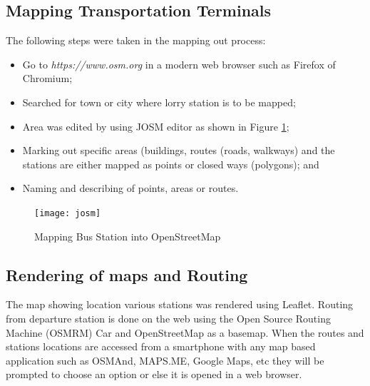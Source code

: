 \subsection{Mapping Transportation Terminals}
The following steps were taken in the mapping out process:
\begin{itemize}
	\item Go to \textit{https://www.osm.org} in a modern web browser such as Firefox of Chromium; 
	\item Searched for town or city where lorry station is to be mapped; 
	\item Area was edited by using JOSM editor as shown in Figure \ref{fig:josm};
	\item Marking out specific areas (buildings, routes (roads, walkways) and the stations are either mapped as points or closed ways (polygons); and
	\item Naming  and describing of points, areas or routes. 
\end{itemize}

\begin{figure}[H]
	\centering
	\texttt{[image: josm]}
	\caption[Mapping Bus Station into OpenStreetMap]{Mapping Bus Station into OpenStreetMap}
	\label{fig:josm}
\end{figure}

\subsection{Rendering of maps and Routing}
The map showing location various stations was rendered using Leaflet. Routing from departure station is done on the web using the Open Source Routing Machine (OSMRM) Car and OpenStreetMap as a basemap. When the routes and stations locations are accessed from a smartphone with any map based application such as OSMAnd, MAPS.ME, Google Maps, etc they will be prompted to choose an option or else it is opened in a web browser.



